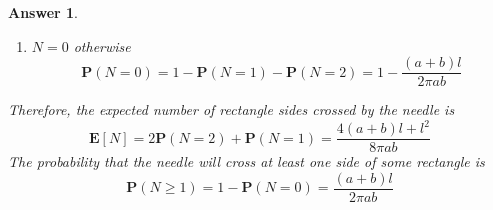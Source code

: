 \documentclass[utf8]{article}
\theoremstyle{definition}%
\theoremstyle{plain}%
\newtheorem{answer}{Answer} %
\begin{document}
\begin{answer}
\begin{enumerate}[label=(\alph*)]
        \begin{equation}
        \begin{aligned}
            \mathbf{P}(N = 1) &= \int_{0}^{\pi}\int_{0}^{b/2}\int_{0}^{\mid l\sin\theta \mid/2} \frac{\dd{x}\dd{y}\dd{\theta}}{\pi a b} + \int_{0}^{\pi}\int_{0}^{\mid l\cos\theta \mid/2}\int_{0}^{a/2} \frac{\dd{x}\dd{y}\dd{\theta}}{\pi a b} - \mathbf{P}(N = 2) \\
            &= \frac{l}{2\pi a} + \frac{l}{2\pi b} - \frac{l^2}{8\pi ab} = \frac{4(a+b)l - l^2}{8\pi ab}
        \end{aligned}
        \end{equation}
        \item $N = 0$ otherwise
        \begin{equation}
            \mathbf{P}(N = 0) = 1 - \mathbf{P}(N = 1) - \mathbf{P}(N = 2) = 1 - \frac{(a+b)l}{2\pi ab}
        \end{equation}
    \end{enumerate}
    Therefore, the expected number of rectangle sides crossed by the needle is
    \begin{equation}
        \mathbf{E}[N] = 2\mathbf{P}(N = 2) + \mathbf{P}(N = 1) = \frac{4(a+b)l + l^2}{8\pi ab}
    \end{equation}
    The probability that the needle will cross at least one side of some rectangle is
    \begin{equation}
        \mathbf{P}(N \geq 1) = 1 - \mathbf{P}(N = 0) = \frac{(a+b)l}{2\pi ab}
    \end{equation}
\end{answer}
\end{document}
